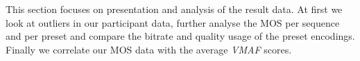 This section focuses on presentation and analysis of the result data. At first we look at outliers in our participant data, further analyse the MOS per sequence and per preset and compare the bitrate and quality usage of the preset encodings. Finally we correlate our MOS data with the average \textit{VMAF} scores.